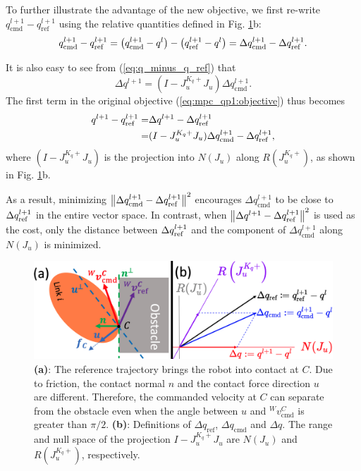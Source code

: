 To further illustrate the advantage of the new objective, we first re-write $q_\text{cmd}^{l+1} - q_\text{ref}^{l+1}$ using the relative quantities defined in Fig. \ref{fig:frictional_contact_objective}b:
\begin{equation}
q_\text{cmd}^{l+1} - \qref[l+1] = \left(q_\text{cmd}^{l+1} - q^l \right) - \left(\qref[l+1] - q^l \right) = \Delta q_\text{cmd}^{l+1} - \Delta \qref[l+1].
\end{equation}

It is also easy to see from (\ref{eq:q_minus_q_ref}) that
\begin{equation}
\Delta q^{l+1} = (I - J_u^{K_q+}J_u) \Delta q_\text{cmd}^{l+1}.
\end{equation}
The first term in the original objective (\ref{eq:mpc_qp1:objective}) thus becomes
\begin{equation}
\begin{aligned}
q^{l+1} - \qref[l+1] =& \Delta q^{l+1} - \Delta \qref[l+1] \\
=& (I - J_u^{K_q+}J_u) \Delta q_\text{cmd}^{l+1} - \Delta \qref[l+1],
\end{aligned}
\end{equation}
where $(I - J_u^{K_q+}J_u)$ is the projection into $N(J_u)$ along $R\left(J_u^{K_q+}\right)$, as shown in Fig. \ref{fig:frictional_contact_objective}b. 

As a result, minimizing $\norm{\Delta q_\text{cmd}^{l+1} - \Delta \qref[l+1]}^2$ encourages $\Delta q_\text{cmd}^{l+1}$ to be close to $\Delta \qref[l+1]$ in the entire vector space. In contrast, when $\norm{\Delta q^{l+1} - \Delta \qref[l+1]}^2$ is used as the cost, only the distance between $\Delta \qref[l+1]$ and the component of $\Delta q_\text{cmd}^{l+1}$ along $N(J_u)$ is minimized.

\begin{figure}[h]
\centering
\includegraphics[width=0.80\linewidth]{figures/04_control/frictional_contact_objective.png}
\caption{\textbf{(a)}: The reference trajectory brings the robot into contact at $C$. Due to friction, the contact normal $n$ and the contact force direction $u$ are different. Therefore, the commanded velocity at $C$ can separate from the obstacle even when the angle between $u$ and ${}^W v^C_\text{cmd}$ is greater than $\pi / 2$. \textbf{(b)}: Definitions of $\Delta q_\text{ref}$, $\Delta q_\text{cmd}$ and $\Delta q$. The range and null space of the projection $I - J_u^{K_q+}J_u$ are $N(J_u)$ and $R\left(J_u^{K_q+}\right)$, respectively.}
\label{fig:frictional_contact_objective}
\end{figure}

